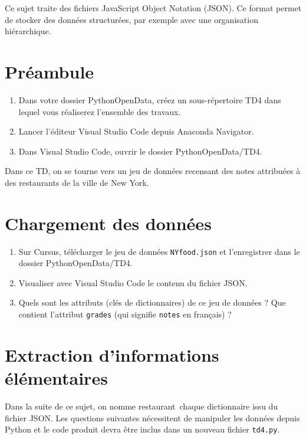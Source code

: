 \documentclass[11pt,a4paper]{article}
\begin{document}
Ce sujet traite des fichiers JavaScript Object Notation (JSON).
Ce format permet de stocker des données structurées, par exemple avec une organisation hiérarchique.

\section*{Préambule}
\begin{enumerate}
    \item Dans votre dossier PythonOpenData, créez un sous-répertoire TD4 dans lequel vous réaliserez l'ensemble des travaux.
    \item Lancer l'éditeur Visual Studio Code depuis Anaconda Navigator.
    \item Dans Visual Studio Code, ouvrir le dossier PythonOpenData/TD4. 
\end{enumerate}

Dans ce TD, on se tourne vers un jeu de données recensant des notes attribuées à des restaurants de la ville de New York.

\section{Chargement des données}

\begin{enumerate}
    \item Sur Cursus, télécharger le jeu de données \verb+NYfood.json+ et l'enregistrer dans le dossier PythonOpenData/TD4.
    \item Visualiser avec Visual Studio Code le contenu du fichier JSON.
    \item Quels sont les attributs (clés de dictionnaires) de ce jeu de données ? Que contient l'attribut \verb+grades+ (qui signifie \verb+notes+ en français) ?
\end{enumerate}

\section{Extraction d'informations élémentaires}

Dans la suite de ce sujet, on nomme \og restaurant\fg ~chaque dictionnaire issu du fichier JSON.
Les questions suivantes nécessitent de manipuler les données depuis Python et le code produit devra être inclus dans un nouveau fichier \verb+td4.py+.
\end{document}
